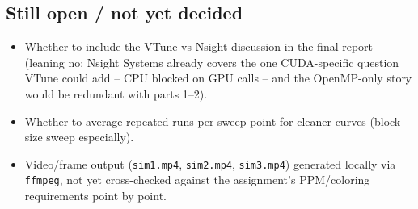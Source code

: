 \subsection{Still open / not yet decided}
\begin{itemize}
\item Whether to include the VTune-vs-Nsight discussion in the final report (leaning no: Nsight Systems already covers the one CUDA-specific question VTune could add -- CPU blocked on GPU calls -- and the OpenMP-only story would be redundant with parts 1--2).
\item Whether to average repeated runs per sweep point for cleaner curves (block-size sweep especially).
\item Video/frame output (\texttt{sim1.mp4}, \texttt{sim2.mp4}, \texttt{sim3.mp4}) generated locally via \texttt{ffmpeg}, not yet cross-checked against the assignment's PPM/coloring requirements point by point.
\end{itemize}
